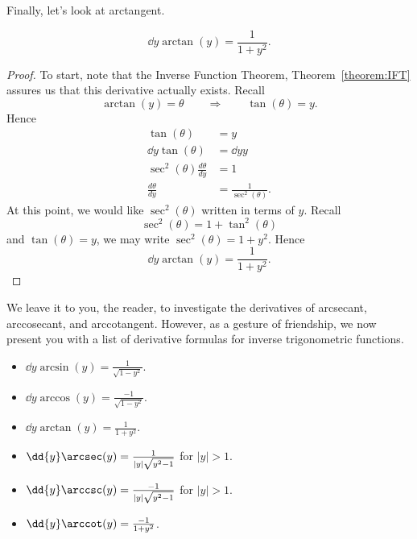 Finally, let's look at arctangent.

\begin{theorem}
\[
\dd{y} \arctan(y) = \frac{1}{1+y^2}.
\]
\end{theorem}

\begin{proof} 
To start, note that the Inverse Function Theorem,
Theorem~\ref{theorem:IFT} assures us that this derivative actually
exists.  Recall
\[
\arctan(y) = \theta \qquad\Rightarrow\qquad \tan(\theta) = y.
\]
Hence
\begin{align*}
\tan(\theta) &= y\\
\dd{y} \tan(\theta) &= \dd{y} y \\
\sec^2(\theta) \frac{d\theta}{dy} &= 1 \\
\frac{d\theta}{dy} &= \frac{1}{\sec^2(\theta)}.
\end{align*}
At this point, we would like $\sec^2(\theta)$ written in terms of $y$. Recall
\[
\sec^2(\theta) = 1+\tan^2(\theta)
\]
and $\tan(\theta) = y$, we may write $\sec^2(\theta)=1+y^2$. Hence
\[
\dd{y} \arctan(y) = \frac{1}{1+y^2}.
\]
\end{proof}

We leave it to you, the reader, to investigate the derivatives of
arcsecant, arccosecant, and arccotangent. However, as a gesture of
friendship, we now present you with a list of derivative formulas for
inverse trigonometric functions.

\begin{mainTheorem} \hfil
\begin{itemize}
\item $\dd{y} \arcsin(y) = \frac{1}{\sqrt{1-y^2}}$.
\item $\dd{y} \arccos(y) = \frac{-1}{\sqrt{1-y^2}}$.
\item $\dd{y} \arctan(y) = \frac{1}{1+y^2}$.
\item $\dd{y} \arcsec(y) = \frac{1}{|y|\sqrt{y^2-1}}$ for $|y|>1$.
\item $\dd{y} \arccsc(y) = \frac{-1}{|y|\sqrt{y^2-1}}$ for $|y|>1$.
\item $\dd{y} \arccot(y) = \frac{-1}{1+y^2}$.
\end{itemize}
\end{mainTheorem}





